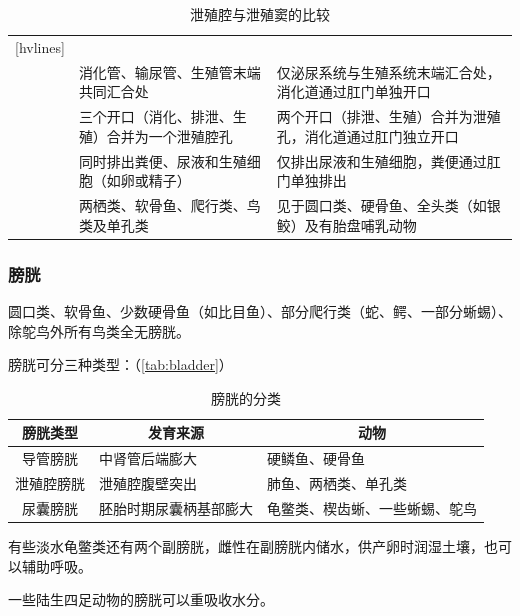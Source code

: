 \begin{table}[htbp]
	\centering
	\begin{NiceTabularX}{\textwidth}{cXX}[hvlines]
		&  &  \\
		 & 消化管、输尿管、生殖管末端共同汇合处 & 仅泌尿系统与生殖系统末端汇合处，消化道通过肛门单独开口 \\
		 & 三个开口（消化、排泄、生殖）合并为一个泄殖腔孔 & 两个开口（排泄、生殖）合并为泄殖孔，消化道通过肛门独立开口 \\
		 & 同时排出粪便、尿液和生殖细胞（如卵或精子）& 仅排出尿液和生殖细胞，粪便通过肛门单独排出 \\
		 & 两栖类、软骨鱼、爬行类、鸟类及单孔类 & 见于圆口类、硬骨鱼、全头类（如银鲛）及有胎盘哺乳动物
	\end{NiceTabularX}
	\caption{泄殖腔与泄殖窦的比较}
	\label{tab:ComparisonOfCloacaAndUrogenitalSinus}
\end{table}

\subsubsection{膀胱}

圆口类、软骨鱼、少数硬骨鱼（如比目鱼）、部分爬行类（蛇、鳄、一部分蜥蜴）、除鸵鸟外所有鸟类全无膀胱。

膀胱可分三种类型：（\autoref{tab:bladder}）

\begin{table}[htbp]
	\centering
	\begin{tabularx}{\textwidth}{|c|l|X|}
		\hline
		膀胱类型 & \multicolumn{1}{c|}{发育来源} & \multicolumn{1}{c|}{动物} \\ \hline
		导管膀胱 & 中肾管后端膨大 & 硬鳞鱼、硬骨鱼 \\ \hline
		泄殖腔膀胱 & 泄殖腔腹壁突出 & 肺鱼、两栖类、单孔类 \\ \hline
		尿囊膀胱 & 胚胎时期尿囊柄基部膨大 & 龟鳖类、楔齿蜥、一些蜥蜴、鸵鸟 \\ \hline
	\end{tabularx}
	\caption{膀胱的分类}
	\label{tab:bladder}
\end{table}

有些淡水龟鳖类还有两个副膀胱，雌性在副膀胱内储水，供产卵时润湿土壤，也可以辅助呼吸。

一些陆生四足动物的膀胱可以重吸收水分。



